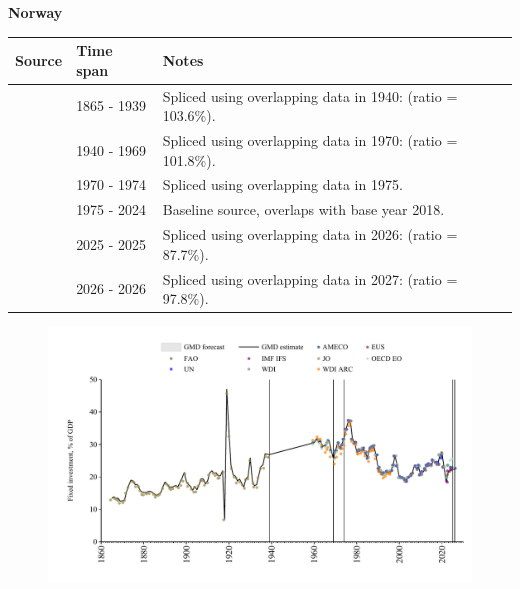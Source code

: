 \documentclass[12pt,a4paper,landscape]{article}
\begin{document}
\begin{adjustbox}{max totalsize={\paperwidth}{\paperheight},center}
\begin{minipage}[t][\textheight][t]{\textwidth}
\vspace*{0.5cm}
{}
\begin{center}
{\Large\bfseries Norway}
\end{center}
\vspace{0.5cm}
\begin{table}[H]
\centering
\small
\begin{tabular}{|l|l|l|}
\hline
\textbf{Source} & \textbf{Time span} & \textbf{Notes} \\
\hline
\rowcolor{white}\cite{JO}& 1865 - 1939 &Spliced using overlapping data in 1940: (ratio = 103.6\%).\\
\rowcolor{lightgray}\cite{OECD_EO}& 1940 - 1969 &Spliced using overlapping data in 1970: (ratio = 101.8\%).\\
\rowcolor{white}\cite{WDI}& 1970 - 1974 &Spliced using overlapping data in 1975.\\
\rowcolor{lightgray}\cite{EUS}& 1975 - 2024 &Baseline source, overlaps with base year 2018.\\
\rowcolor{white}\cite{OECD_EO}& 2025 - 2025 &Spliced using overlapping data in 2026: (ratio = 87.7\%).\\
\rowcolor{lightgray}\cite{AMECO}& 2026 - 2026 &Spliced using overlapping data in 2027: (ratio = 97.8\%).\\
\hline
\end{tabular}
\end{table}
\begin{figure}[H]
\centering
\includegraphics[width=\textwidth,height=0.6\textheight,keepaspectratio]{graphs/NOR_finv_GDP.pdf}
\end{figure}
\end{minipage}
\end{adjustbox}
\end{document}
